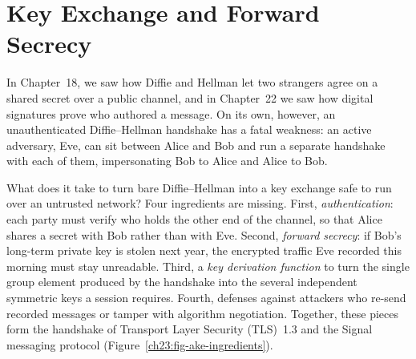 \chapter{Key Exchange and Forward Secrecy}

In Chapter~18, we saw how Diffie and Hellman let two strangers agree on a shared
secret over a public channel, and in Chapter~22 we saw how digital signatures
prove who authored a message. On its own, however, an unauthenticated
Diffie--Hellman handshake has a fatal weakness: an active adversary, Eve, can
sit between Alice and Bob and run a separate handshake with each of them,
impersonating Bob to Alice and Alice to Bob.

What does it take to turn bare Diffie--Hellman into a key exchange safe to run
over an untrusted network? Four ingredients are missing. First,
\emph{authentication}: each party must verify who holds the other end of the
channel, so that Alice shares a secret with Bob rather than with Eve. Second,
\emph{forward secrecy}: if Bob's long-term private key is stolen next year, the
encrypted traffic Eve recorded this morning must stay unreadable. Third, a
\emph{key derivation function} to turn the single group element produced by the
handshake into the several independent symmetric keys a session requires.
Fourth, defenses against attackers who re-send recorded messages or tamper with
algorithm negotiation. Together, these pieces form the handshake of Transport
Layer Security (TLS)~1.3 and the Signal messaging protocol (Figure~\ref{ch23:fig-ake-ingredients}).

